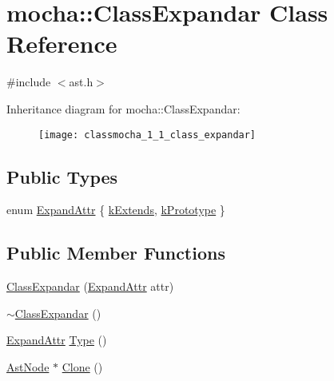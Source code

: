 \hypertarget{classmocha_1_1_class_expandar}{
\section{mocha::ClassExpandar Class Reference}
\label{classmocha_1_1_class_expandar}
}


{\ttfamily \#include $<$ast.h$>$}

Inheritance diagram for mocha::ClassExpandar:\begin{figure}[H]
\begin{center}
\leavevmode
\texttt{[image: classmocha\_1\_1\_class\_expandar]}
\end{center}
\end{figure}
\subsection*{Public Types}
\begin{DoxyCompactItemize}
\item 
enum \hyperlink{classmocha_1_1_class_expandar_ab2e8fbff2016d78e9eb128f90e1fc7df}{ExpandAttr} \{ \hyperlink{classmocha_1_1_class_expandar_ab2e8fbff2016d78e9eb128f90e1fc7dfaf61e7f3912848c1da2126eb296ae0da9}{kExtends}, 
\hyperlink{classmocha_1_1_class_expandar_ab2e8fbff2016d78e9eb128f90e1fc7dfafc78d230a7579d6ad8ff7bc317f59078}{kPrototype}
 \}
\end{DoxyCompactItemize}
\subsection*{Public Member Functions}
\begin{DoxyCompactItemize}
\item 
\hyperlink{classmocha_1_1_class_expandar_a0c6019411ac6660872e460d0768613e7}{ClassExpandar} (\hyperlink{classmocha_1_1_class_expandar_ab2e8fbff2016d78e9eb128f90e1fc7df}{ExpandAttr} attr)
\item 
\hyperlink{classmocha_1_1_class_expandar_a87db54a95c1341d9c547388a7ceffd48}{$\sim$ClassExpandar} ()
\item 
\hyperlink{classmocha_1_1_class_expandar_ab2e8fbff2016d78e9eb128f90e1fc7df}{ExpandAttr} \hyperlink{classmocha_1_1_class_expandar_a3ecc25d967144064854cd79317b3cebc}{Type} ()
\item 
\hyperlink{classmocha_1_1_ast_node}{AstNode} $\ast$ \hyperlink{classmocha_1_1_class_expandar_a0942e40301ca95fb470443801da7c837}{Clone} ()
\end{DoxyCompactItemize}
